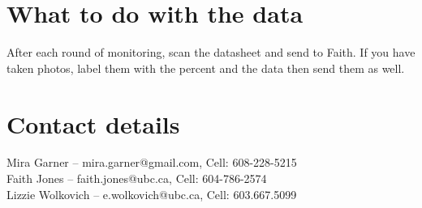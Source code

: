\documentclass[11pt,letter]{article}
\begin{document}
\section{What to do with the data}
After each round of monitoring, scan the datasheet and send to Faith. If you have taken photos, label them with the percent and the data then send them as well.

\section{Contact details}
Mira Garner -- mira.garner@gmail.com, Cell: 608-228-5215\\
Faith Jones -- faith.jones@ubc.ca, Cell: 604-786-2574\\
Lizzie Wolkovich -- e.wolkovich@ubc.ca, Cell: 603.667.5099\\
\end{document}

